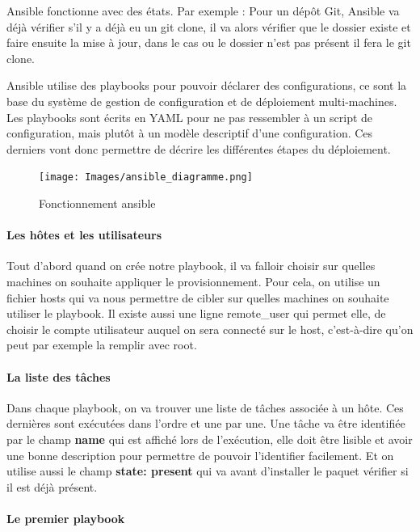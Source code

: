\documentclass[]{article}
\let\oldparagraph\paragraph
\renewcommand{\paragraph}[1]{\oldparagraph{#1}\mbox{}}
\begin{document}
Ansible fonctionne avec des états.
Par exemple :
Pour un dépôt Git, Ansible va déjà vérifier s'il y a déjà eu un git clone, il va alors vérifier que le dossier existe et faire ensuite la mise à jour, dans le cas ou le dossier n'est pas présent il fera le git clone.

Ansible utilise des playbooks pour pouvoir déclarer des configurations,
ce sont la base du système de gestion de configuration et de déploiement
multi-machines. Les playbooks sont écrits en YAML pour ne pas ressembler
à un script de configuration, mais plutôt à un modèle descriptif d'une
configuration. Ces derniers vont donc permettre de décrire les différentes étapes du déploiement.

\begin{figure}
\centering
\texttt{[image: Images/ansible\_diagramme.png]}
\caption{Fonctionnement ansible}
\end{figure}


\paragraph{Les hôtes et les utilisateurs}\label{les-huxf4tes-et-les-utilisateurs}

Tout d'abord quand on crée notre playbook, il va falloir choisir sur
quelles machines on souhaite appliquer le provisionnement. Pour cela, on
utilise un fichier hosts qui va nous permettre de cibler sur quelles
machines on souhaite utiliser le playbook. Il existe aussi une ligne
remote\_user qui permet elle, de choisir le compte utilisateur auquel
on sera connecté sur le host, c'est-à-dire qu'on peut par exemple la
remplir avec root.

\paragraph{La liste des tâches}\label{la-liste-des-tuxe2ches}

Dans chaque playbook, on va trouver une liste de tâches associée à un
hôte. Ces dernières sont exécutées dans l'ordre et une par une. Une
tâche va être identifiée par le champ \textbf{name} qui est affiché lors de
l'exécution, elle doit être lisible et avoir une bonne description pour
permettre de pouvoir l'identifier facilement.
Et on utilise aussi le champ \textbf{state: present} qui va avant d'installer le paquet vérifier si il est déjà présent.

\paragraph{Le premier playbook}\label{le-premier-playbook}
\end{document}
